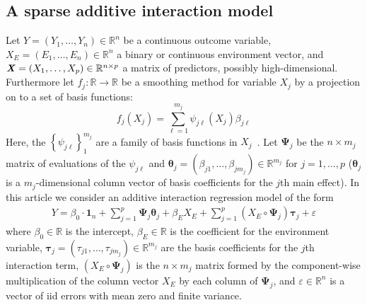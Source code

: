 \documentclass[12pt,letter]{article}\usepackage[]{graphicx}\usepackage[]{color}
\newcommand{\bX}{\textbf{\emph{X}}}
\newcommand{\btau}{\boldsymbol{\tau}}
\newcommand{\e}{{\mathsf E}}
\newcommand{\bmu}{\boldsymbol{\mu}}
\newcommand{\btheta}{\boldsymbol{\theta}}
\newcommand{\bPsi}{\boldsymbol{\Psi}}
\begin{document}
\subsection{A sparse additive interaction model}
Let $Y=(Y_1, \ldots, Y_n) \in \mathbb{R}^n$ be a continuous outcome variable, \mbox{$X_E=(E_1, \ldots, E_n) \in \mathbb{R}^n$} a binary or continuous environment vector, and \mbox{$\bX = (X_{1}, \ldots, X_{p}) \in \mathbb{R}^{n\times p}$} a matrix of predictors, possibly high-dimensional. Furthermore let $f_j: \mathbb{R} \rightarrow \mathbb{R}$ be a smoothing method for variable $X_j$ by a projection on to a set of basis functions:
\begin{equation}
	f_j(X_j) = \sum_{\ell = 1}^{m_j} \psi_{j\ell}(X_j) \beta_{j\ell} \label{eq:smooth}
\end{equation}
Here, the $\left\lbrace \psi_{j\ell} \right\rbrace_1^{m_j}$ are a family of basis functions in $X_j$~\citep{hastie2015statistical}. Let $\bPsi_j$ be the $n \times m_j$ matrix of evaluations of the $\psi_{j\ell}$ and \mbox{$\btheta_j = (\beta_{j1}, \ldots, \beta_{jm_j}) \in \mathbb{R}^{m_j}$} for $j = 1, \ldots, p$ ($\btheta_j$ is a $m_j$-dimensional column vector of basis coefficients for the $j$th main effect). In this article we consider an additive interaction regression model of the form
\begin{align}
Y = \beta_0 \cdot \boldsymbol{1}_n + \sum_{j=1}^p \bPsi_j \btheta_j + \beta_E X_E + \sum_{j=1}^p (X_E \circ \bPsi_j) \btau_j + \varepsilon  \label{eq:linpred}
\end{align}
where $\beta_0 \in \mathbb{R}$ is the intercept, $\beta_E \in \mathbb{R}$ is the coefficient for the environment variable, $\btau_j = (\tau_{j1}, \ldots, \tau_{jm_j})\in \mathbb{R}^{m_j}$ are the basis coefficients for the $j$th interaction term, $(X_E \circ \bPsi_j)$ is the $n \times m_j$ matrix formed by the component-wise multiplication of the column vector $X_E$ by each column of $\bPsi_j$, and $\varepsilon \in \mathbb{R}^n$ is a vector of iid errors with mean zero and finite variance. %
\end{document}
